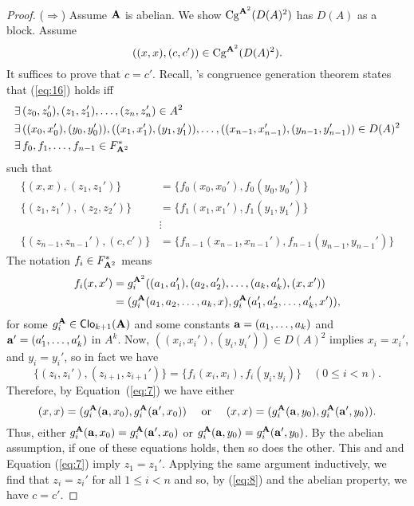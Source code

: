 {\begin{proof}
  \noindent ($\Rightarrow$) Assume $\mathbf{A}$ is abelian. We show
  $\operatorname{Cg}^{\mathbf{A}^2}(D(A)^2)$ has $D(A)$ as a block.  Assume
  \begin{equation}
    \label{eq:16}
  ((x,x), (c,c')) \in \Cg^{\bA^2}(D(A)^2).
  \end{equation}
  It suffices to prove that $c=c'$.  Recall, \malcev's congruence generation
  theorem states that (\ref{eq:16}) holds iff
  \begin{align*}
  \exists \,& (z_0,z_0'), (z_1,z_1'), \dots, (z_n,z_n') \in A^2\\
    \exists \,& ((x_0,x_0'), (y_0,y_0')), ((x_1,x_1'), (y_1,y_1')), \dots, 
    ((x_{n-1},x_{n-1}'), (y_{n-1},y_{n-1}')) \in D(A)^2\\
    \exists \, & f_0, f_1, \dots, f_{n-1}\in F^*_{\mathbf{A}^2}
  \end{align*}
  such that 
  \begin{align}
    \label{eq:7}
    \{(x, x),(z_1,z_1')\} &= \{f_0(x_0,x_0'), f_0(y_0,y_0')\}\\
    \nonumber
     \{(z_1,z_1'),(z_2,z_2')\} &= \{f_1(x_1,x_1'), f_1(y_1,y_1')\}\\
    \nonumber
     & \vdots\\
    \label{eq:8}
     \{(z_{n-1},z_{n-1}'),(c, c')\} &= \{f_{n-1}(x_{n-1},x_{n-1}'), f_{n-1}(y_{n-1},y_{n-1}')\}
  \end{align}
  The notation $f_i\in F^*_{\mathbf{A}^2}$ means 
  \begin{align*}
    f_i(x, x') &= g_i^{\mathbf{A}^2}((a_1, a_1'), (a_2, a_2'), \dots, (a_k, a_k'), (x, x'))\\
               &= (g_i^{\mathbf{A}}(a_1, a_2, \dots, a_k, x), g_i^{\mathbf{A}}(a_1', a_2', \dots, a_k', x')),
  \end{align*}
  for some $g_i^{\mathbf{A}} \in \operatorname{\mathsf{Clo}}_{k+1}(\mathbf{A})$ and some constants 
  $\mathbf{a} = (a_1, \dots, a_k)$ and $\mathbf{a}' = (a_1', \dots, a_k')$ in $A^k$. 
  Now, $((x_i,x_i'), (y_i,y_i'))\in D(A)^2$ implies 
  $x_i=x_i'$, and $y_i=y_i'$, so in fact we have 
  \[
    \{(z_i,z_i'),(z_{i+1},z_{i+1}')\} = \{f_i(x_i,x_i), f_i(y_i,y_i)\} \quad (0\leq i < n).
  \]
  Therefore, by Equation~(\ref{eq:7}) we have either 
  \[
    (x,x)= (g_i^{\mathbf{A}}(\mathbf{a}, x_0), g_i^{\mathbf{A}}(\mathbf{a}', x_0)) \quad \text{ or } \quad 
    (x,x)= (g_i^{\mathbf{A}}(\mathbf{a}, y_0), g_i^{\mathbf{A}}(\mathbf{a}', y_0)).
  \]
  Thus, either $g_i^{\mathbf{A}}(\mathbf{a}, x_0) =  g_i^{\mathbf{A}}(\mathbf{a}', x_0)$ %
  or $g_i^{\mathbf{A}}(\mathbf{a}, y_0) =  g_i^{\mathbf{A}}(\mathbf{a}', y_0)$.
  By the abelian assumption, if one of these equations holds, then so does the
  other. This and and Equation (\ref{eq:7}) imply $z_1 = z_1'$.  Applying the same
  argument inductively, we find that $z_i = z_i'$ for all $1\leq i < n$ and so, by
  (\ref{eq:8}) and the abelian property, we have $c= c'$.
\end{proof}

}
